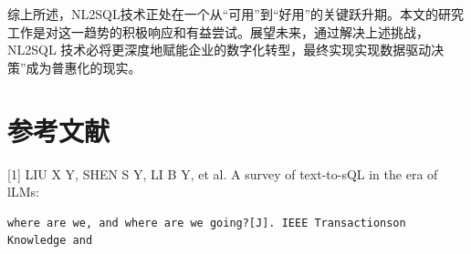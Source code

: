 \documentclass[12pt,a4paper,openright,UTF8]{ctexbook}
\begin{document}
综上所述，NL2SQL技术正处在一个从“可用”到“好用”的关键跃升期。本文的研究工作是对这一趋势的积极响应和有益尝试。展望未来，通过解决上述挑战，NL2SQL 技术必将更深度地赋能企业的数字化转型，最终实现实现数据驱动决策”成为普惠化的现实。

\chapter*{参考文献}

[1] LIU X Y, SHEN S Y, LI B Y, et al. A survey of text-to-sQL in the era of lLMs:

\begin{lstlisting}
where are we, and where are we going?[J]. IEEE Transactionson Knowledge and
\end{lstlisting}
\end{document}
